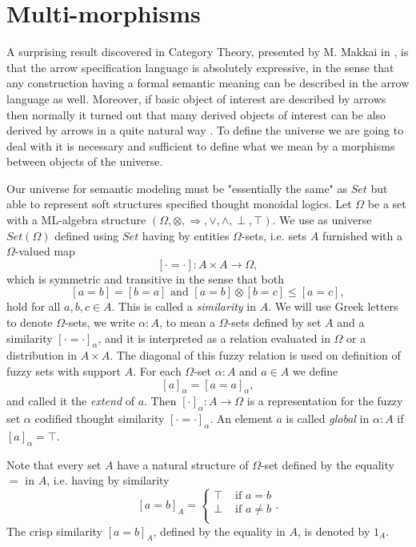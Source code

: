 \documentclass[oribibl]{llncs}
\begin{document}
\section{Multi-morphisms}\label{multi-morphisms}

A surprising result discovered in Category Theory, presented by M. Makkai in \cite{Makki89}, is that the arrow specification language is absolutely expressive, in the sense that any construction having a formal semantic meaning can be described in the arrow language as well. Moreover, if basic object of interest are described by arrows then normally it turned out that many derived objects of interest can be also derived by arrows in a quite natural way \cite{Diskin99}. To define the universe we are going to deal with it is necessary and sufficient to define what we mean by a morphisms between objects of the universe.

Our universe for semantic modeling must be "essentially the same" as $Set$ but able to represent soft structures specified thought monoidal logics. Let $\Omega$ be a set with a ML-algebra structure $(\Omega,\otimes,\Rightarrow,\vee,\wedge,\perp,\top)$. We use as universe $Set(\Omega)$ defined using $Set$  having by entities $\Omega$-sets, i.e. sets $A$ furnished with a $\Omega$-valued map
\[
[\cdot=\cdot]:A\times A\rightarrow\Omega,
\]
which is symmetric and transitive in the sense that both
\[
[a=b]=[b=a]\text{ and } [a=b]\otimes[b=c]\leq [a=c],
\]
hold for all $a,b,c\in A$. This is called a \emph{similarity} in $A$. We will use Greek letters to denote  $\Omega$-sets, we write $\alpha:A$, to mean a $\Omega$-sets defined by set $A$ and a similarity $[\cdot=\cdot]_\alpha$, and it is interpreted as a relation evaluated in $\Omega$ or a distribution in $A\times A$. The diagonal of this fuzzy relation is used on definition of fuzzy sets with support $A$. For each $\Omega$-set $\alpha:A$ and $a\in A$ we define
\[[a]_\alpha=[a=a]_\alpha,\]
and called it the \emph{extend} of $a$. Then $[\cdot]_\alpha:A\rightarrow\Omega$ is a representation for the fuzzy set $\alpha$ codified thought similarity $[\cdot=\cdot]_\alpha$. An element $a$ is called \emph{global} in $\alpha:A$ if $[a]_\alpha=\top$.

Note that every set $A$ have a natural structure of $\Omega$-set defined by the equality $=$ in $A$, i.e. having by similarity
\[
[a=b]_A=\left\{
        \begin{array}{cc}
          \top & \text{ if }a=b \\
          \bot & \text{ if }a\neq b \\
        \end{array}
      \right..
\]The crisp similarity $[a=b]_A$, defined by the equality in $A$, is denoted by $1_A$.
\end{document}

